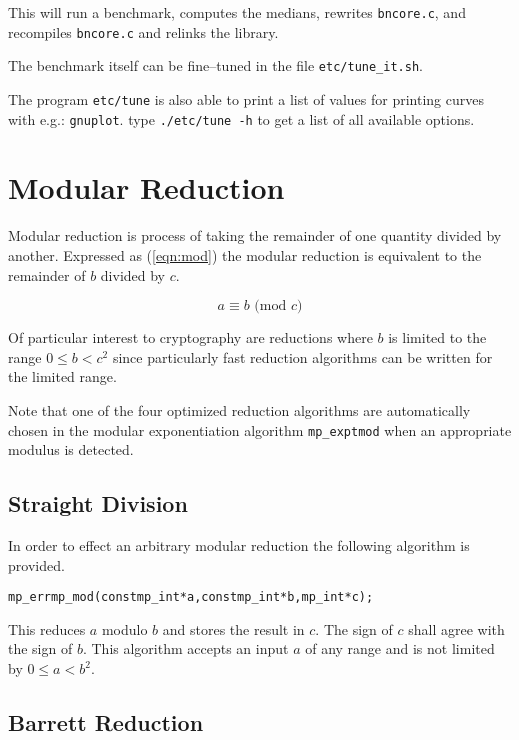 \documentclass[synpaper]{book}
\begin{document}
This will run a benchmark, computes the medians, rewrites \texttt{bncore.c}, and recompiles
\texttt{bncore.c} and relinks the library.

The benchmark itself can be fine--tuned in the file \texttt{etc/tune\_it.sh}.

The program \texttt{etc/tune} is also able to print a list of values for printing curves with e.g.:
\texttt{gnuplot}. type \texttt{./etc/tune -h} to get a list of all available options.

\chapter{Modular Reduction}

Modular reduction is process of taking the remainder of one quantity divided by another.  Expressed
as (\ref{eqn:mod}) the modular reduction is equivalent to the remainder of $b$ divided by $c$.

\begin{equation}
  a \equiv b \mbox{ (mod }c\mbox{)}
  \label{eqn:mod}
\end{equation}

Of particular interest to cryptography are reductions where $b$ is limited to the range $0 \le b <
  c^2$ since particularly fast reduction algorithms can be written for the limited range.

Note that one of the four optimized reduction algorithms are automatically chosen in the modular
exponentiation algorithm \texttt{mp\_exptmod} when an appropriate modulus is detected.

\section{Straight Division}
In order to effect an arbitrary modular reduction the following algorithm is provided.

\begin{alltt}
mp_err mp_mod(const mp_int *a,const  mp_int *b, mp_int *c);
\end{alltt}

This reduces $a$ modulo $b$ and stores the result in $c$.  The sign of $c$ shall agree with the
sign of $b$.  This algorithm accepts an input $a$ of any range and is not limited by $0 \le a <
  b^2$.

\section{Barrett Reduction}
\end{document}
